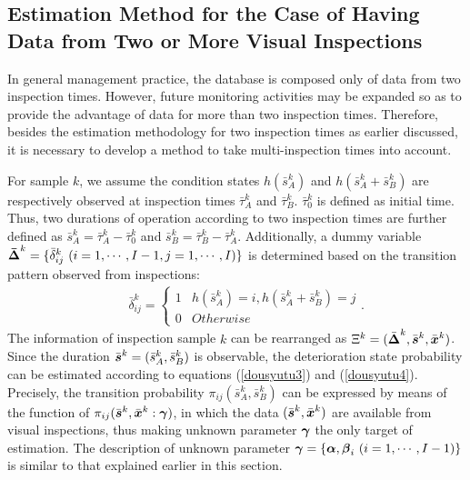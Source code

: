 \subsection{Estimation Method for the Case of Having Data from Two or More Visual Inspections}
\label{343}
In general management practice, the database is composed only of data from two inspection times. However, future monitoring activities may be expanded so as to provide the advantage of data for more than two inspection times. Therefore, besides the estimation methodology for two inspection times as earlier discussed, it is necessary to develop a method to take multi-inspection times into account.

For sample $k$, we assume the condition states $h(\bar{s}_A^k)$ and $h(\bar{s}_A^k+\bar{s}_B^k)$ are respectively observed at inspection times $\bar{\tau}_A^k$ and $\bar{\tau}_B^k$. $\bar{\tau}_0^k$ is defined as initial time. Thus, two durations of operation according to two inspection times are further defined as $\bar{s}_A^k=\bar{\tau}_A^k-\bar{\tau}_0^k$ and $\bar{s}_B^k=\bar{\tau}_B^k-\bar{\tau}_A^k$. Additionally, a dummy variable $\mbox{\boldmath$\bar{\Delta}$}^k=\{ \bar{\delta}_{ij}^k~(i=1,\cdots,I-1, j=1,\cdots,I)\}$ is determined based on the transition pattern observed from inspections:
%
\begin{eqnarray}
&& \bar{\delta}_{ij}^k=\left\{
\begin{array}{ll}
1 & h(\bar{s}_A^k)=i,h(\bar{s}_{A}^k+\bar{s}_B^k)= j\\
0 & Otherwise
\end{array}.
\right.
\end{eqnarray}
The information of inspection sample $k$ can be rearranged as $\Xi^k=(\bar{\mbox{\boldmath$\Delta$}}^k,\bar{\mbox{\boldmath$s$}}^k,\bar{\mbox{\boldmath$x$}}^k)$. Since the duration $\bar{\mbox{\boldmath$s$}}^k=(\bar{s}_A^k,\bar{s}_B^k)$ is observable, the deterioration state probability can be estimated according to equations (\ref{dousyutu3}) and (\ref{dousyutu4}). Precisely, the transition probability $\pi_{ij}(\bar{s}_A^k,\bar{s}_B^k)$ can be expressed by means of the function of $\pi_{ij}(\bar{\mbox{\boldmath$s$}}^k,\bar{\mbox{\boldmath$x$}}^k:\mbox{\boldmath$\gamma$})$, in which  the data $(\bar{\mbox{\boldmath$s$}}^k,\bar{\mbox{\boldmath$x$}}^k)$ are available from visual inspections, thus making unknown parameter $\mbox{\boldmath$\gamma$}$ the only target of estimation. The description of unknown parameter $\mbox{\boldmath$\gamma$}=\{\mbox{\boldmath$\alpha$},\mbox{\boldmath$\beta$}_i~(i=1,\cdots,I-1)\}$ is similar to that explained earlier in this section.

